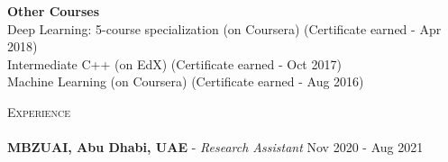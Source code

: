 \documentclass{article}
\newcommand{\lineunder} {
    \vspace*{-8pt} \\
    \hspace*{-18pt} \hrulefill \\
}
\newcommand{\header} [1] {
	\needspace{1em}
    {\hspace*{-18pt}\vspace*{6pt} \textsc{#1}}
    \vspace*{-6pt} \lineunder
}
\begin{document}
{{		\textbf{Other Courses} \\
		Deep Learning: 5-course specialization (on Coursera) \hfill (Certificate earned - Apr 2018)\\
		Intermediate C++ (on EdX)	\hfill  (Certificate earned - Oct 2017) \\
		Machine Learning (on Coursera) 	\hfill (Certificate earned - Aug 2016) \\
		\vspace{2mm}
	}{}
	\vspace{2mm}
}


\header{Experience}
\vspace{1mm}
\textbf{MBZUAI, Abu Dhabi, UAE} - \textit{Research Assistant} \hfill Nov 2020 - Aug 2021 \\	
	\iftoggle{medium}{
		\begin{itemize}[leftmargin=*,labelindent=5.5mm,labelsep=1.3mm,topsep=0.1mm, parsep=0.1mm, itemsep=0.5mm]  %
			\item Self-supervised video representation learning: multi-modal data, contrastive methods (CVPR '22)
		    \item Adversarial attacks and their transferability (ICLR '22)
			\item Interpretability and robustness of vision transformers (Neurips '21)
			\item Generative modelling for multi-modal output spaces (ICLR '21)
		\end{itemize}
	}{}
\vspace{2mm}
\end{document}

